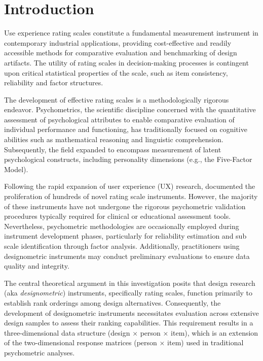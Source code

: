 \documentclass[
  authoryear,
  review]{elsarticle}
\begin{document}
\section{Introduction}\label{introduction}

Use experience rating scales constitute a fundamental measurement
instrument in contemporary industrial applications, providing
cost-effective and readily accessible methods for comparative evaluation
and benchmarking of design artifacts. The utility of rating scales in
decision-making processes is contingent upon critical statistical
properties of the scale, such as item consistency, reliability and
factor structures.

The development of effective rating scales is a methodologically
rigorous endeavor. Psychometrics, the scientific discipline concerned
with the quantitative assessment of psychological attributes to enable
comparative evaluation of individual performance and functioning, has
traditionally focused on cognitive abilities such as mathematical
reasoning and linguistic comprehension. Subsequently, the field expanded
to encompass measurement of latent psychological constructs, including
personality dimensions (e.g., the Five-Factor Model).

Following the rapid expansion of user experience (UX) research,
\citet{Bargas-Avila2011} documented the proliferation of hundreds of
novel rating scale instruments. However, the majority of these
instruments have not undergone the rigorous psychometric validation
procedures typically required for clinical or educational assessment
tools. Nevertheless, psychometric methodologies are occasionally
employed during instrument development phases, particularly for
reliability estimation and sub scale identification through factor
analysis. Additionally, practitioners using designometric instruments
may conduct preliminary evaluations to ensure data quality and
integrity.

The central theoretical argument in this investigation posits that
design research (aka \emph{designometric}) instruments, specifically
rating scales, function primarily to establish rank orderings among
design alternatives. Consequently, the development of designometric
instruments necessitates evaluation across extensive design samples to
assess their ranking capabilities. This requirement results in a
three-dimensional data structure (design × person × item), which is an
extension of the two-dimensional response matrices (person × item) used
in traditional psychometric analyses.
\end{document}
